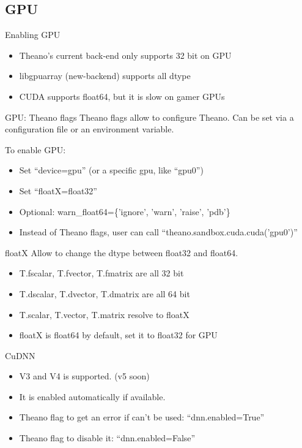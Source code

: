 \documentclass[utf8x,xcolor=pdftex,dvipsnames,table]{beamer}
\begin{document}
\subsection{GPU}
\begin{frame}{Enabling GPU}
  \begin{itemize}
  \item Theano's current back-end only supports 32 bit on GPU
  \item libgpuarray (new-backend) supports all dtype
  \item CUDA supports float64, but it is slow on gamer GPUs
  \end{itemize}
\end{frame}


\begin{frame}{GPU: Theano flags}
  Theano flags allow to configure Theano. Can be set via a
  configuration file or an environment variable.

  To enable GPU:
  \begin{itemize}
  \item Set ``device=gpu'' (or a specific gpu, like ``gpu0'')
  \item Set ``floatX=float32''
  \item Optional: warn\_float64=\{'ignore', 'warn', 'raise', 'pdb'\}
  \item Instead of Theano flags, user can call ``theano.sandbox.cuda.cuda('gpu0')''
  \end{itemize}
\end{frame}


\begin{frame}{floatX}
  Allow to change the dtype between float32 and float64.
  \begin{itemize}
  \item T.fscalar, T.fvector, T.fmatrix are all 32 bit
  \item T.dscalar, T.dvector, T.dmatrix are all 64 bit
  \item T.scalar, T.vector, T.matrix resolve to floatX
  \item floatX is float64 by default, set it to float32 for GPU
  \end{itemize}
\end{frame}

\begin{frame}{CuDNN}
  \begin{itemize}
  \item V3 and V4 is supported. (v5 soon)
  \item It is enabled automatically if available.
  \item Theano flag to get an error if can't be used: ``dnn.enabled=True''
  \item Theano flag to disable it: ``dnn.enabled=False''
  \end{itemize}
\end{frame}
\end{document}
